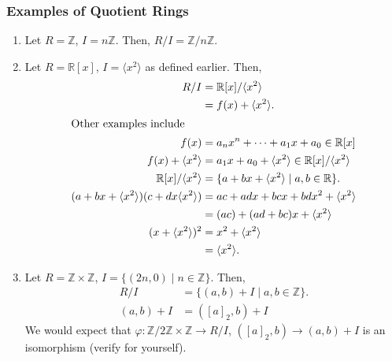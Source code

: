 \documentclass[10pt]{extarticle}
\newcommand{\Z}{\mathbb{Z}}
\newcommand{\R}{\mathbb{R}}
\begin{document}
  \subsubsection{Examples of Quotient Rings}%
  \begin{enumerate}[(1)]
    \item Let $R = \Z$, $I = n\Z$. Then, $R/I = \Z/n\Z$.
    \item Let $R = \R[x]$, $I = \langle x^2\rangle$ as defined earlier. Then,
      \begin{align*}
        R/I &= \R[x]/\langle x^2\rangle\\
            &= f(x) + \langle x^2 \rangle.\\
            \shortintertext{Other examples include}
        f(x) &= a_nx^n + \cdots + a_1x + a_0 \in \R[x]\\
        f(x) + \langle x^2 \rangle &= a_1 x + a_0 + \langle x^2 \rangle \in \R[x]/\langle x^2\rangle\\
        \R[x]/\langle x^2\rangle &= \{a+bx + \langle x^2 \rangle\mid a,b\in\R\}.\\
        (a+bx + \langle x^2 \rangle)(c + dx \langle x^2 \rangle) &= ac + ad x + bc x + bdx^2 + \langle x^2 \rangle\\
                                                                 &= (ac) + (ad + bc) x + \langle x^2 \rangle\\
        (x+\langle x^2\rangle)^2 &= x^2 + \langle x^2 \rangle\\
                                 &= \langle x^2 \rangle.
      \end{align*}
    \item Let $R = \Z\times\Z$, $I = \{(2n,0)\mid n\in\Z\}$. Then,
      \begin{align*}
        R/I &= \{(a,b) + I\mid a,b\in\Z\}.\\
        (a,b) + I &= ([a]_2,b) + I \tag*{where $[a]_2$ is $a$ modulo 2.}
      \end{align*}
      We would expect that $\varphi: \Z/2\Z\times \Z \rightarrow R/I$, $([a]_2,b)\rightarrow (a,b) + I$ is an isomorphism (verify for yourself).
  \end{enumerate}
\end{document}
